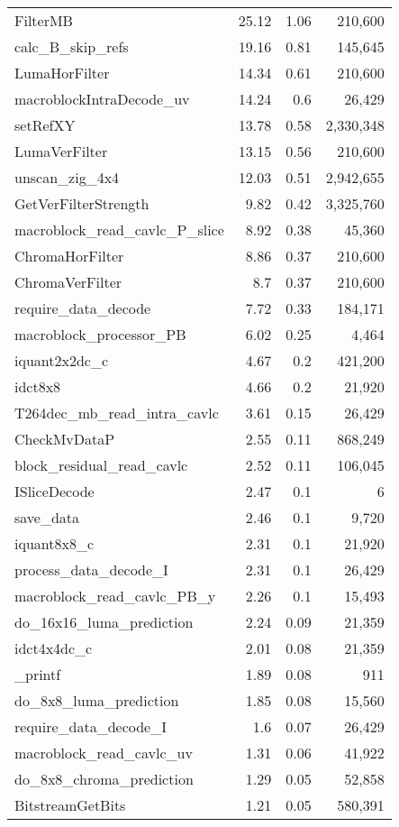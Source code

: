 \begin{longtable}[\textwidth]{lrrr}
    FilterMB & 25.12 & 1.06  & 210,600 \\
    calc\_B\_skip\_refs & 19.16 & 0.81  & 145,645 \\
    LumaHorFilter & 14.34 & 0.61  & 210,600 \\
    macroblockIntraDecode\_uv & 14.24 & 0.6   & 26,429 \\
    setRefXY & 13.78 & 0.58  & 2,330,348 \\
    LumaVerFilter & 13.15 & 0.56  & 210,600 \\
    unscan\_zig\_4x4 & 12.03 & 0.51  & 2,942,655 \\
    GetVerFilterStrength & 9.82  & 0.42  & 3,325,760 \\
    macroblock\_read\_cavlc\_P\_slice & 8.92  & 0.38  & 45,360 \\
    ChromaHorFilter & 8.86  & 0.37  & 210,600 \\
    ChromaVerFilter & 8.7   & 0.37  & 210,600 \\
    require\_data\_decode & 7.72  & 0.33  & 184,171 \\
    macroblock\_processor\_PB & 6.02  & 0.25  & 4,464 \\
    iquant2x2dc\_c & 4.67  & 0.2   & 421,200 \\
    idct8x8 & 4.66  & 0.2   & 21,920 \\
    T264dec\_mb\_read\_intra\_cavlc & 3.61  & 0.15  & 26,429 \\
    CheckMvDataP & 2.55  & 0.11  & 868,249 \\
    block\_residual\_read\_cavlc & 2.52  & 0.11  & 106,045 \\
    ISliceDecode & 2.47  & 0.1   & 6 \\
    save\_data & 2.46  & 0.1   & 9,720 \\
    iquant8x8\_c & 2.31  & 0.1   & 21,920 \\
    process\_data\_decode\_I & 2.31  & 0.1   & 26,429 \\
    macroblock\_read\_cavlc\_PB\_y & 2.26  & 0.1   & 15,493 \\
    do\_16x16\_luma\_prediction & 2.24  & 0.09  & 21,359 \\
    idct4x4dc\_c & 2.01  & 0.08  & 21,359 \\
    \_printf & 1.89  & 0.08  & 911 \\
    do\_8x8\_luma\_prediction & 1.85  & 0.08  & 15,560 \\
    require\_data\_decode\_I & 1.6   & 0.07  & 26,429 \\
    macroblock\_read\_cavlc\_uv & 1.31  & 0.06  & 41,922 \\
    do\_8x8\_chroma\_prediction & 1.29  & 0.05  & 52,858 \\
    BitstreamGetBits & 1.21  & 0.05  & 580,391 \\
    \bottomrule[1.5pt]
\end{longtable}
